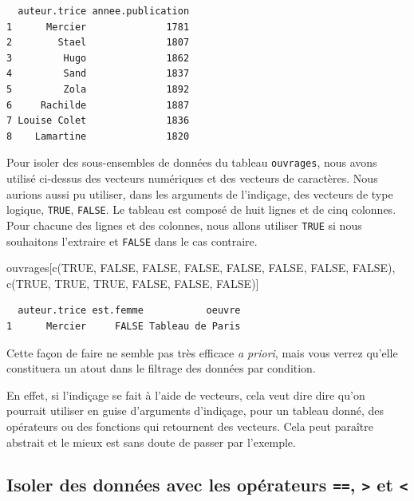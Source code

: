 \documentclass[
  letterpaper,
  DIV=11,
  numbers=noendperiod]{scrartcl}
\newenvironment{Shaded}{\begin{snugshade}}{\end{snugshade}}
\newcommand{\ConstantTok}[1]{\textcolor[rgb]{0.56,0.35,0.01}{#1}}
\newcommand{\FunctionTok}[1]{\textcolor[rgb]{0.28,0.35,0.67}{#1}}
\newcommand{\NormalTok}[1]{\textcolor[rgb]{0.00,0.23,0.31}{#1}}
\begin{document}
\begin{verbatim}
  auteur.trice annee.publication
1      Mercier              1781
2        Stael              1807
3         Hugo              1862
4         Sand              1837
5         Zola              1892
6     Rachilde              1887
7 Louise Colet              1836
8    Lamartine              1820
\end{verbatim}

Pour isoler des sous-ensembles de données du tableau \texttt{ouvrages},
nous avons utilisé ci-dessus des vecteurs numériques et des vecteurs de
caractères. Nous aurions aussi pu utiliser, dans les arguments de
l'indiçage, des vecteurs de type logique, \texttt{TRUE}, \texttt{FALSE}.
Le tableau est composé de huit lignes et de cinq colonnes. Pour chacune
des lignes et des colonnes, nous allons utiliser \texttt{TRUE} si nous
souhaitons l'extraire et \texttt{FALSE} dans le cas contraire.

\begin{Shaded}
\begin{Highlighting}[]
\NormalTok{ouvrages[}\FunctionTok{c}\NormalTok{(}\ConstantTok{TRUE}\NormalTok{, }\ConstantTok{FALSE}\NormalTok{, }\ConstantTok{FALSE}\NormalTok{, }\ConstantTok{FALSE}\NormalTok{, }\ConstantTok{FALSE}\NormalTok{, }\ConstantTok{FALSE}\NormalTok{, }\ConstantTok{FALSE}\NormalTok{, }\ConstantTok{FALSE}\NormalTok{), }\FunctionTok{c}\NormalTok{(}\ConstantTok{TRUE}\NormalTok{, }\ConstantTok{TRUE}\NormalTok{, }\ConstantTok{TRUE}\NormalTok{, }\ConstantTok{FALSE}\NormalTok{, }\ConstantTok{FALSE}\NormalTok{, }\ConstantTok{FALSE}\NormalTok{)]}
\end{Highlighting}
\end{Shaded}

\begin{verbatim}
  auteur.trice est.femme           oeuvre
1      Mercier     FALSE Tableau de Paris
\end{verbatim}

Cette façon de faire ne semble pas très efficace \emph{a priori}, mais
vous verrez qu'elle constituera un atout dans le filtrage des données
par condition.

En effet, si l'indiçage se fait à l'aide de vecteurs, cela veut dire
dire qu'on pourrait utiliser en guise d'arguments d'indiçage, pour un
tableau donné, des opérateurs ou des fonctions qui retournent des
vecteurs. Cela peut paraître abstrait et le mieux est sans doute de
passer par l'exemple.

\hypertarget{isoler-des-donnuxe9es-avec-les-opuxe9rateurs-et}{%
\subsection{\texorpdfstring{Isoler des données avec les opérateurs
\texttt{==}, \texttt{\textgreater{}} et
\texttt{\textless{}}}{Isoler des données avec les opérateurs ==, \textgreater{} et \textless{}}}\label{isoler-des-donnuxe9es-avec-les-opuxe9rateurs-et}}
\end{document}
